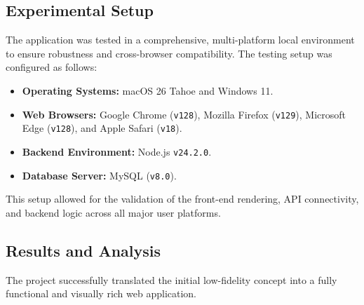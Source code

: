 \documentclass[12pt,a4paper]{article}
\begin{document}
    \subsection{Experimental Setup}
    The application was tested in a comprehensive, multi-platform local environment to ensure robustness and cross-browser compatibility. The testing setup was configured as follows:
    \begin{itemize}[label=$\bullet$, leftmargin=*]
        \item \textbf{Operating Systems:} macOS 26 Tahoe and Windows 11.
        \item \textbf{Web Browsers:} Google Chrome (\texttt{v128}), Mozilla Firefox (\texttt{v129}), Microsoft Edge (\texttt{v128}), and Apple Safari (\texttt{v18}).
        \item \textbf{Backend Environment:} Node.js \texttt{v24.2.0}.
        \item \textbf{Database Server:} MySQL (\texttt{v8.0}).
    \end{itemize}
    This setup allowed for the validation of the front-end rendering, API connectivity, and backend logic across all major user platforms.
    \subsection{Results and Analysis}
    The project successfully translated the initial low-fidelity concept into a fully functional and visually rich web application.
\end{document}
